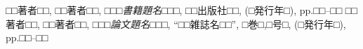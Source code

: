{\small
\begin{thebibliography}{99}
    □□著者□□, □□著者□□,
    {\it □□□書籍題名□□□},
    □□出版社□□, (□発行年□),
    pp.□□--□□
    □□著者□□, □□著者□□,
    {\it □□□論文題名□□□},
    ``□□雑誌名□□'',
    □巻□,□号□, (□発行年□),
    pp.□□--□□
\end{thebibliography}}
